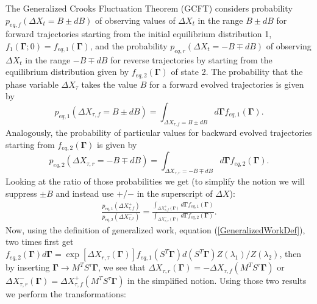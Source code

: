 \documentclass[a4paper,12pt]{article}
\begin{document}
The Generalized Crooks Fluctuation Theorem (GCFT) considers probability $p_{eq,f}(\Delta X_t = B \pm dB)$ of observing values of $\Delta X_t$ in the range $B\pm dB$ for forward trajectories starting from the initial equilibrium distribution 1, $f_1(\bm{\Gamma};0)=f_{eq,1}(\bm{\Gamma})$, and the probability $p_{eq,r}(\Delta X_t = -B \mp dB)$ of observing $\Delta X_t$ in the range $ -B\mp dB$ for reverse trajectories by starting from the equilibrium distribution given by $f_{eq,2}(\bm{\Gamma})$ of state 2.
The probability that the phase variable $\Delta X_{\tau}$ takes the value $B$ for a forward evolved trajectories is given by
\begin{equation}
  p_{eq,1}(\Delta X_{\tau,f}=B\pm dB) = \int_{\Delta X_{\tau,f}=B\pm dB} d\bm{\Gamma} f_{eq,1}(\bm{\Gamma}).
\end{equation}
Analogously, the probability of particular values for backward evolved trajectories starting from $f_{eq,2}(\bm{\Gamma})$ is given by
\begin{equation}
  p_{eq,2}(\Delta X_{\tau,r}=-B\mp dB) = \int_{\Delta X_{\tau,r}=-B\mp dB} d\bm{\Gamma} f_{eq,2}(\bm{\Gamma}).
\end{equation}
Looking at the ratio of those probabilities we get (to simplify the notion we will suppress $\pm B$ and instead use $+$/$-$ in the superscript of $\Delta X$):
\begin{equation}
\begin{aligned}
  \frac{p_{eq,1}(\Delta X_{\tau,f}^+)}{p_{eq,2}(\Delta X_{\tau,r}^-)}
= \frac{\int_{\Delta X_{\tau,f}^+(\bm{\Gamma})} d\bm{\Gamma} f_{eq,1}(\bm{\Gamma})}{\int_{\Delta X_{\tau,r}^-(\bm{\Gamma})} d\bm{\Gamma} f_{eq,2}(\bm{\Gamma})}.
\end{aligned}
\end{equation}
Now, using the definition of generalized work, equation (\ref{GeneralizedWorkDef}), two times first get $f_{eq,2}(\bm{\Gamma})d\bm{\Gamma}= \exp[\Delta X_{r,\tau}(\bm{\Gamma})] f_{eq,1}(S^T \bm{\Gamma}) d(S^T \bm{\Gamma}) Z(\lambda_1)/Z(\lambda_2) $, then by inserting $\bm{\Gamma} \to M^T S^{\tau} \bm{\Gamma}$, we see that $\Delta X_{\tau,r}(\bm{\Gamma}) = -\Delta X_{\tau,f}(M^T S^{\tau} \bm{\Gamma}) $ or $\Delta X_{\tau,r}^-(\bm{\Gamma}) = \Delta X_{\tau,f}^+(M^T S^{\tau} \bm{\Gamma}) $ in the simplified notion. Using those two results we perform the transformations:
\end{document}
